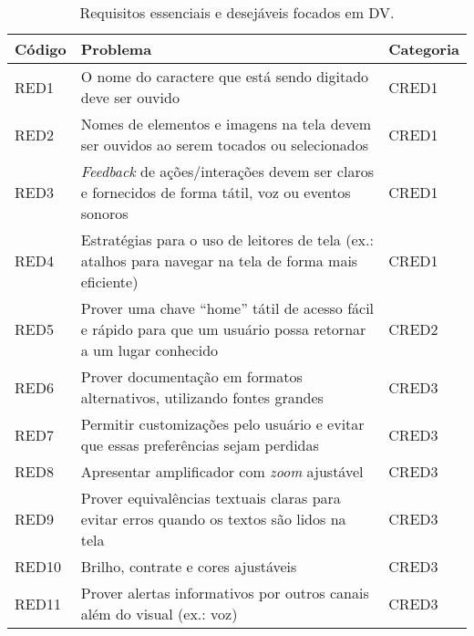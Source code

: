 \begin{table}[htb]
  \begin{center}
    \ABNTEXfontereduzida
    \caption{Requisitos essenciais e desejáveis focados em DV.}
    \label{tab-req-ess-des-1}
    \begin{tabular}{p{1.0cm}|p{12.1cm}|p{1.4cm}}
      \textbf{Código} & \textbf{Problema}                                                                                                & \textbf{Categoria} \\
      \hline
      RED1            & O nome do caractere que está sendo digitado deve ser ouvido                                                      & CRED1              \\
      \hline
      RED2            & Nomes de elementos e imagens na tela devem ser ouvidos ao serem tocados ou selecionados                          & CRED1              \\
      \hline
      RED3            & \emph{Feedback} de ações/interações devem ser claros e fornecidos de forma tátil, voz ou eventos sonoros         & CRED1              \\
      \hline
      RED4            & Estratégias para o uso de leitores de tela (ex.\@: atalhos para navegar na tela de forma mais eficiente)         & CRED1              \\
      \hline
      RED5            & Prover uma chave ``home'' tátil de acesso fácil e rápido para que um usuário possa retornar a um lugar conhecido & CRED2              \\
      \hline
      RED6            & Prover documentação em formatos alternativos, utilizando fontes grandes                                          & CRED3              \\
      \hline
      RED7            & Permitir customizações pelo usuário e evitar que essas preferências sejam perdidas                               & CRED3              \\
      \hline
      RED8            & Apresentar amplificador com \emph{zoom} ajustável                                                                & CRED3              \\
      \hline
      RED9            & Prover equivalências textuais claras para evitar erros quando os textos são lidos na tela                        & CRED3              \\
      \hline
      RED10           & Brilho, contrate e cores ajustáveis                                                                              & CRED3              \\
      \hline
      RED11           & Prover alertas informativos por outros canais além do visual (ex.\@: voz)                                        & CRED3              \\
    \end{tabular}
  \end{center}
\end{table}

